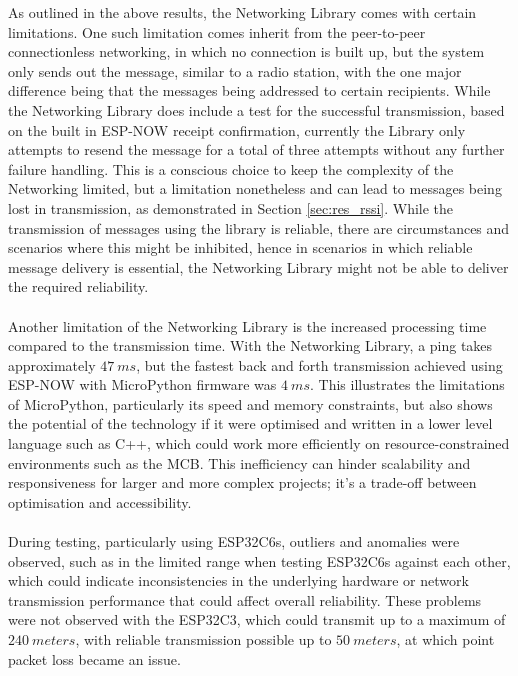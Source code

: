 As outlined in the above results, the Networking Library comes with certain limitations. One such limitation comes inherit from the peer-to-peer connectionless networking, in which no connection is built up, but the system only sends out the message, similar to a radio station, with the one major difference being that the messages being addressed to certain recipients. While the Networking Library does include a test for the successful transmission, based on the built in ESP-NOW receipt confirmation, currently the Library only attempts to resend the message for a total of three attempts without any further failure handling. This is a conscious choice to keep the complexity of the Networking limited, but a limitation nonetheless and can lead to messages being lost in transmission, as demonstrated in Section \ref{sec:res_rssi}. While the transmission of messages using the library is reliable, there are circumstances and scenarios where this might be inhibited, hence in scenarios in which reliable message delivery is essential, the Networking Library might not be able to deliver the required reliability. \\\\
Another limitation of the Networking Library is the increased processing time compared to the transmission time. With the Networking Library, a ping takes approximately $47\ ms$, but the fastest back and forth transmission achieved using ESP-NOW with MicroPython firmware was $4\ ms$. This illustrates the limitations of MicroPython, particularly its speed and memory constraints, but also shows the potential of the technology if it were optimised and written in a lower level language such as C++, which could work more efficiently on resource-constrained environments such as the MCB. This inefficiency can hinder scalability and responsiveness for larger and more complex projects; it's a trade-off between optimisation and accessibility.\\\\
During testing, particularly using ESP32C6s, outliers and anomalies were observed, such as in the limited range when testing ESP32C6s against each other, which could indicate inconsistencies in the underlying hardware or network transmission performance that could affect overall reliability. These problems were not observed with the ESP32C3, which could transmit up to a maximum of $240\ meters$, with reliable transmission possible up to $50\ meters$, at which point packet loss became an issue. \\\\
